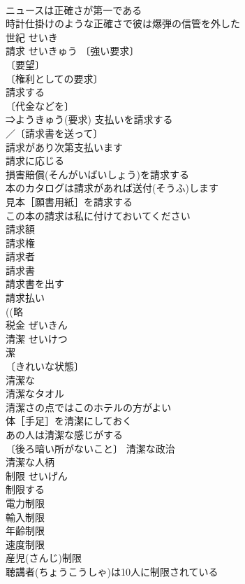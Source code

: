 \documentclass[8pt]{extreport}
\begin{document}
\begin{CJK}{UTF8}{min}
\\	ニュースは正確さが第一である 
\\	時計仕掛けのような正確さで彼は爆弾の信管を外した 
\\	世紀	せいき	
\\	請求	せいきゅう	〔強い要求〕
\\	〔要望〕
\\	〔権利としての要求〕
\\	請求する 
\\	〔代金などを〕
\\	⇒ようきゅう(要求) 支払いを請求する 
\\	／〔請求書を送って〕
\\	請求があり次第支払います 
\\	請求に応じる 
\\	損害賠償(そんがいばいしょう)を請求する 
\\	本のカタログは請求があれば送付(そうふ)します 
\\	見本［願書用紙］を請求する 
\\	この本の請求は私に付けておいてください 
\\	請求額 
\\	請求権 
\\	請求者 
\\	請求書 
\\	請求書を出す 
\\	請求払い 
\\	((略
\\	税金	ぜいきん	
\\	清潔	せいけつ	
\\	潔 
\\	〔きれいな状態〕
\\	清潔な 
\\	清潔なタオル 
\\	清潔さの点ではこのホテルの方がよい 
\\	体［手足］を清潔にしておく 
\\	あの人は清潔な感じがする 
\\	〔後ろ暗い所がないこと〕 清潔な政治 
\\	清潔な人柄 
\\	制限	せいげん	
\\	制限する 
\\	電力制限 
\\	輸入制限 
\\	年齢制限 
\\	速度制限 
\\	産児(さんじ)制限 
\\	聴講者(ちょうこうしゃ)は10人に制限されている 

\end{CJK}
\end{document}

